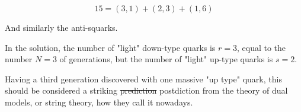 \documentclass[10pt]{article}
\begin{document}
\begin{equation}
15=(3,1)+(2,3)+(1,6)
\end{equation}

And similarly the anti-squarks.

In the solution, the number of "light" down-type quarks is $r=3$, equal to the number $N=3$ of generations, but the 
number of "light" up-type quarks is $s=2$.

Having a third generation discovered with one massive "up type" quark, this
should be considered a striking \sout{prediction} postdiction from 
the theory of dual models,
or string theory, how they call it nowadays.









\end{document}
